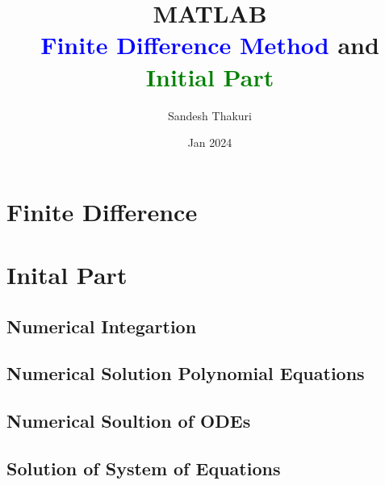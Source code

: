 \documentclass[a4paper,14pt,twoside,onecolumn,openany,final]{memoir}
\author{Sandesh Thakuri}
\title{\textcolor{red!70!black}{MATLAB}\\[5mm]
\textcolor{blue}{Finite Difference Method} and\\[1mm] \textcolor{green}{Initial Part}}
\date{Jan 2024}
\begin{document}
\frontmatter



\tableofcontents
\mainmatter

\part{Finite Difference}


\part{Inital Part}

\chapter{Numerical Integartion}


\chapter{Numerical Solution Polynomial Equations}


\chapter{Numerical Soultion of ODEs}


\chapter{Solution of System of Equations}



\end{document}
